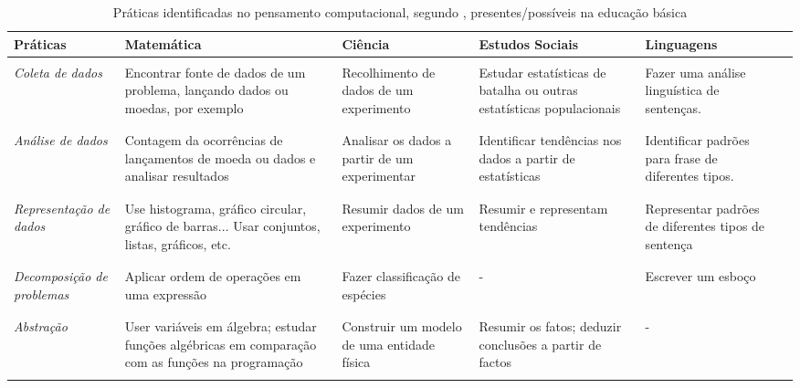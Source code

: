 
\begin{table}[htb]
  \caption{Práticas identificadas no pensamento computacional, segundo ,  presentes/possíveis na educação básica}
  \label{tab:barr-1}

  \begin{center}
    \begin{tabularx}{\textwidth}{@{}YYYYYY@{}}
      \hline 
      \textbf{Práticas} & \textbf{Matemática} & \textbf{Ciência} & \textbf{Estudos Sociais} & \textbf{Linguagens} \\

      \hline
      \\
      \textit{Coleta de   dados} & Encontrar fonte de dados de um problema, lançando dados ou moedas, por exemplo & Recolhimento de dados de um
      experimento & Estudar estatísticas de batalha ou outras estatísticas populacionais & Fazer uma análise linguística
      de sentenças. \\ \\

      \hline
      \\
      \textit{Análise de dados} & Contagem da ocorrências de lançamentos de moeda ou dados e analisar resultados & Analisar os dados a partir de um experimentar & Identificar tendências nos dados a partir de estatísticas & Identificar padrões para frase de diferentes tipos. \\ \\
      
      \hline
      \\
      \textit{ Representação de dados} & Use histograma, gráfico circular, gráfico de barras... Usar conjuntos, listas, gráficos, etc. & Resumir dados de um experimento & Resumir e representam tendências & Representar padrões de diferentes tipos de sentença \\ \\

      \hline
      \\
      \textit{Decomposição de problemas} & Aplicar ordem de operações em uma
      expressão & Fazer classificação de espécies & - & Escrever um esboço \\ \\ 

      \hline
      \\
      \textit{Abstração} & User variáveis em álgebra; estudar funções algébricas em comparação com as funções na programação & Construir um modelo de uma entidade física & Resumir os fatos; deduzir conclusões a partir de factos & - \\ \\%
      \hline
    \end{tabularx}
  \end{center}
\end{table}

